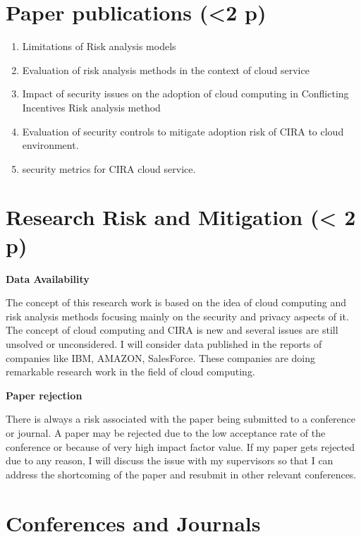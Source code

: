\documentclass[a4paper,twoside,10pt]{report}
\begin{document}
\section{Paper publications (<2 p)}\label{PaperPub}

\begin{enumerate}
\item Limitations of Risk analysis models
\item Evaluation of risk analysis methods in the context of cloud service
\item Impact of security issues on the adoption of cloud computing in Conflicting Incentives Risk analysis method
\item Evaluation of security controls to mitigate adoption risk  of CIRA to cloud environment.
\item security metrics for CIRA cloud service.
\end{enumerate}

\section{Research Risk and Mitigation (< 2 p)}\label{ResRiskMit}

\textbf{Data Availability}

The concept of this research work is based on the idea of cloud computing and risk analysis methods focusing mainly on the security and privacy aspects of it. The concept of cloud computing and CIRA is new and several issues are still unsolved or unconsidered. I will consider data published in the reports of companies like IBM, AMAZON, SalesForce. These companies are doing remarkable research work in the field of cloud computing.

\textbf{Paper rejection}

There is always a risk associated with the paper being submitted to a conference or journal. A paper may be rejected due to the low acceptance rate of the conference or because of very high impact factor value. If my paper gets rejected due to any reason, I will discuss the issue with my supervisors so that I can address the shortcoming of the paper and resubmit in other relevant conferences.

\section{Conferences and Journals}\label{Confpub}
\end{document}
